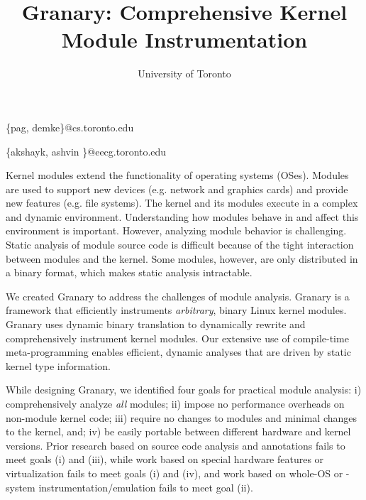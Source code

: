 \documentclass[10pt,preprint,nocopyrightspace]{sigplanconf}
\begin{document}



\title{Granary: Comprehensive Kernel Module Instrumentation}
\subtitle{University of Toronto}

           {\{pag, demke\}@cs.toronto.edu}

           {\{akshayk, ashvin \}@eecg.toronto.edu}

\maketitle

\renewcommand{\secref}[1]{\S\ref{sec:#1}}

\newcommand{\sysname}{Granary}
\newcommand{\Sysname}{Granary}


\newcommand{\note}[1]{}

Kernel modules extend the functionality of operating systems (OSes). Modules are used to support new devices (e.g. network and graphics cards) and provide new features (e.g. file systems). The kernel and its modules execute in a complex and dynamic environment. Understanding how modules behave in and affect this environment is important. However, analyzing module behavior is challenging. Static analysis of module source code is difficult because of the tight interaction between modules and the kernel. Some modules, however, are only distributed in a binary format, which makes static analysis intractable.

We created {\Sysname} to address the challenges of module analysis. {\Sysname} is a framework that efficiently instruments \emph{arbitrary}, binary Linux kernel modules. {\Sysname} uses dynamic binary translation to dynamically rewrite and comprehensively instrument kernel modules. Our extensive use of compile-time meta-programming enables efficient, dynamic analyses that are driven by static kernel type information. 

While designing {\sysname}, we identified four goals for practical module analysis: i) comprehensively analyze \emph{all} modules; ii) impose no performance overheads on non-module kernel code; iii) require no changes to modules and minimal changes to the kernel, and; iv) be easily portable between different hardware and kernel versions. Prior research based on source code analysis and annotations \cite{YMao2011} fails to meet goals (i) and (iii), while work based on special hardware features or virtualization \cite{Xiong2011} fails to meet goals (i) and (iv), and work based on whole-OS or -system instrumentation/emulation \cite{Feiner2012} fails to meet goal (ii).
\end{document}
